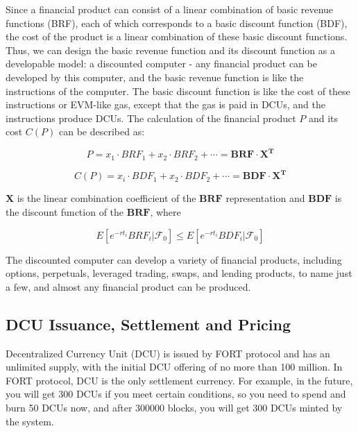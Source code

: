 \documentclass[letterpaper,12pt]{article}
\begin{document}
Since a financial product can consist of a linear combination of basic revenue functions (BRF), each of which corresponds to a basic discount function (BDF), the cost of the product is a linear combination of these basic discount functions.
Thus, we can design the basic revenue function and its discount function as a developable model: a discounted computer - any financial product can be developed by this computer, and the basic revenue function is like the instructions of the computer. 
The basic discount function is like the cost of these instructions or EVM-like gas, except that the gas is paid in DCUs, and the instructions produce DCUs. The calculation of the financial product $P$ and its cost $C(P)$ can be described as:

\begin{equation}
P=x_1\cdot BRF_1+x_2\cdot BRF_2+\cdots=\boldsymbol{BRF}\cdot \boldsymbol{X^T}
\end{equation}

\begin{equation} 
C(P)=x_i\cdot BDF_1+x_2\cdot BDF_2+\cdots=\boldsymbol{BDF}\cdot \boldsymbol{X^T}
\end{equation}

\noindent $\boldsymbol{X}$ is the linear combination coefficient of the $\boldsymbol{BRF}$ representation and $\boldsymbol{BDF}$ is the discount function of the $\boldsymbol{BRF}$, where

\begin{equation}
E\left[e^{-rt_{i}}BRF_{i}|\mathcal{F}_0\right] \leq E\left[e^{-rt_{i}}BDF_{i}|\mathcal{F}_0\right] 
\end{equation}

The discounted computer can develop a variety of financial products, including options, perpetuals, leveraged trading, swaps, and lending products, to name just a few, and almost any financial product can be produced.

\subsection{DCU Issuance, Settlement and Pricing}

Decentralized Currency Unit (DCU) is issued by FORT protocol and has an unlimited supply, with the initial DCU offering of no more than 100 million. In FORT protocol, DCU is the only settlement currency.
For example, in the future, you will get 300 DCUs if you meet certain conditions, so you need to spend and burn 50 DCUs now, and after 300000 blocks, you will get 300 DCUs minted by the system.
\end{document}
